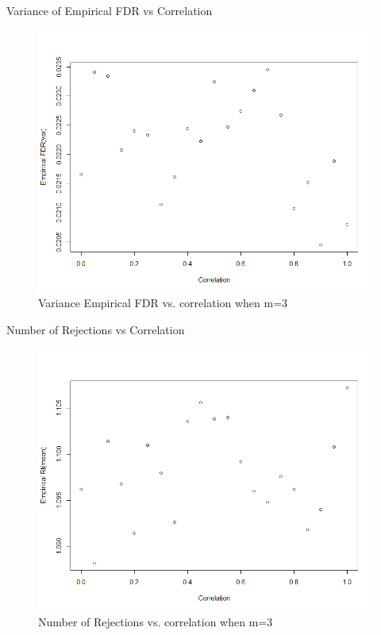 \documentclass{beamer}
\begin{document}
\begin{frame}[t]{Variance of Empirical FDR vs Correlation}\vspace{10pt}

\begin{figure}[h]
	\centering
	\includegraphics[scale=0.35]{fdrVarVSrho_m=3}
	\caption{\footnotesize{Variance Empirical FDR vs. correlation when m=3}}
	\label{fig2}
\end{figure}

\end{frame}

\begin{frame}[t]{Number of Rejections vs Correlation}\vspace{10pt}

\begin{figure}[h]
	\centering
	\includegraphics[scale=0.35]{rtMeanVSrho_m=3}
	\caption{\footnotesize{Number of Rejections vs. correlation when m=3}}
	\label{fig3}
\end{figure}

\end{frame}
\end{document}
